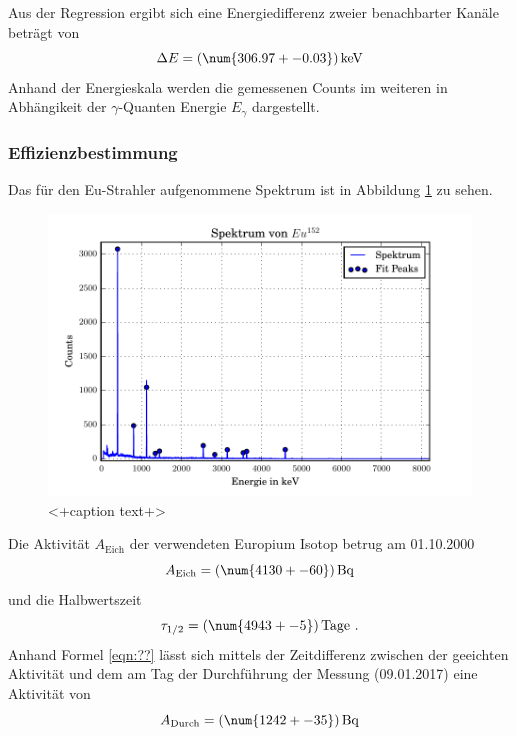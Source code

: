 Aus der Regression ergibt sich eine Energiedifferenz zweier benachbarter Kanäle beträgt von
\begin{equation}
  \Delta E = (\num{306.97 +- 0.03}) \, \text{keV}
  \label{eqn:Reg}
\end{equation}
Anhand der Energieskala werden die gemessenen Counts im weiteren in Abhängikeit der $\gamma$-Quanten Energie $E_{\gamma}$ dargestellt.
\subsubsection{Effizienzbestimmung}
\label{sec:Q}
Das für den Eu-Strahler aufgenommene Spektrum ist in Abbildung \ref{fig:SpekCs} zu sehen.
\begin{figure}[htpb]
  \centering
  \includegraphics[width=\textwidth]{./build/SpektEu.pdf}
  \caption{<+caption text+>}
  \label{fig:SpekCs}
\end{figure}
Die Aktivität $A_\text{Eich}$ der verwendeten Europium Isotop betrug am 01.10.2000
\begin{equation}
  A_\text{Eich} = (\num{4130 +- 60}) \, \text{Bq}
  \label{eqn:AktEu}
\end{equation}
und die Halbwertszeit
\begin{equation}
  \tau_{1/2} = (\num{4943 +- 5}) \, \text{Tage} \ .
  \label{eqn:halb}
\end{equation}
Anhand Formel \ref{eqn:??} lässt sich mittels der Zeitdifferenz zwischen der geeichten Aktivität und dem am Tag der Durchführung der Messung (09.01.2017) eine Aktivität von
\begin{equation}
  A_\text{Durch} = (\num{1242 +- 35}) \, \text{Bq}
  \label{eqn:AktEEu}
\end{equation}
